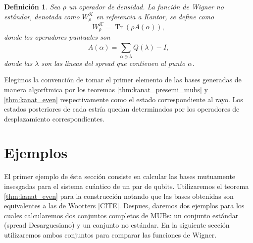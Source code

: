 \documentclass[a4paper]{report}
\DeclareMathOperator{\Tr}{Tr}
\newtheorem{definition}{Definición}
\begin{document}
  \begin{definition}
    Sea $\rho$ un operador de densidad. La función de Wigner
    no estándar, denotada como $W_\rho^{\mathcal K}$ en
    referencia a Kantor, se define como
    \begin{equation}
      W_\rho^{\mathcal K}
      = \Tr\left( \rho A(\alpha) \right),
    \end{equation}
    donde los operadores puntuales son
    \begin{equation}
      A(\alpha)
      = \sum_{\alpha \ni \lambda}^{} Q(\lambda) - I,
    \end{equation}
    donde las $\lambda$ son las lineas del spread que
    contienen al punto $\alpha$.
  \end{definition}

  Elegimos la convención de tomar el primer elemento de las
  bases generadas de manera algorítmica por los teoremas
  \ref{thm:kanat_presemi_mubs} y \ref{thm:kanat_even}
  respectivamente como el estado correspondiente al rayo.
  Los estados posteriores de cada estría quedan determinados
  por los operadores de desplazamiento correspondientes.

  \section{Ejemplos}

  El primer ejemplo de ésta sección consiste en calcular las
  bases mutuamente insesgadas para el sistema cuántico de un
  par de qubits. Utilizaremos el teorema
  \ref{thm:kanat_even} para la construcción notando que las
  bases obtenidas son equivalentes a las de Wootters [CITE].
  Despues, daremos dos ejemplos para los cuales calcularemos
  dos conjuntos completos de MUBs: un conjunto estándar
  (spread Desarguesiano) y un conjunto no estándar. En la
  siguiente sección utilizaremos ambos conjuntos para
  comparar las funciones de Wigner.
\end{document}
